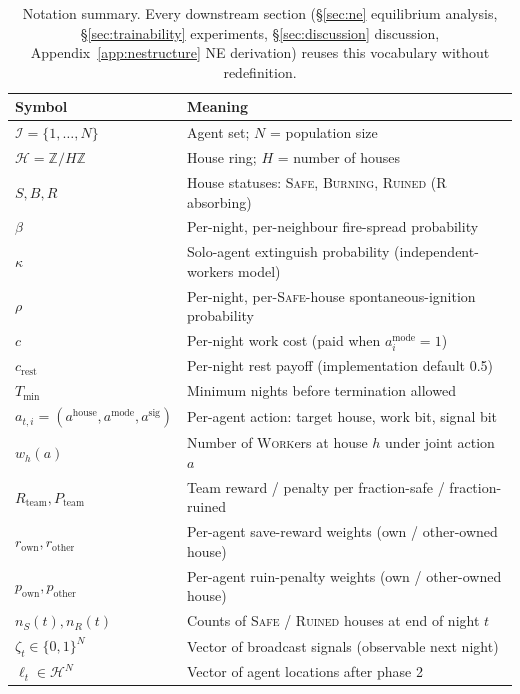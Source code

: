\documentclass{anvil-paper}
\begin{document}
\begin{table}[h]
  \centering
  \small
  \setlength{\tabcolsep}{4pt}
  \begin{tabular}{ll}
    \toprule
    Symbol & Meaning \\
    \midrule
    $\mathcal{I}=\{1,\ldots,N\}$ & Agent set; $N$ = population size \\
    $\mathcal{H}=\mathbb{Z}/H\mathbb{Z}$ & House ring; $H$ = number of houses \\
    $S,B,R$ & House statuses: \textsc{Safe}, \textsc{Burning}, \textsc{Ruined} (R absorbing) \\
    $\beta$ & Per-night, per-neighbour fire-spread probability \\
    $\kappa$ & Solo-agent extinguish probability (independent-workers model) \\
    $\rho$ & Per-night, per-\textsc{Safe}-house spontaneous-ignition probability \\
    $c$ & Per-night work cost (paid when $a_i^{\text{mode}}=1$) \\
    $c_{\text{rest}}$ & Per-night rest payoff (implementation default 0.5) \\
    $T_{\min}$ & Minimum nights before termination allowed \\
    $a_{t,i}=(a^{\text{house}},a^{\text{mode}},a^{\text{sig}})$
      & Per-agent action: target house, work bit, signal bit \\
    $w_h(a)$ & Number of \textsc{Work}ers at house $h$ under joint action $a$ \\
    $R_{\text{team}},P_{\text{team}}$
      & Team reward / penalty per fraction-safe / fraction-ruined \\
    $r_{\text{own}},r_{\text{other}}$
      & Per-agent save-reward weights (own / other-owned house) \\
    $p_{\text{own}},p_{\text{other}}$
      & Per-agent ruin-penalty weights (own / other-owned house) \\
    $n_S(t),n_R(t)$ & Counts of \textsc{Safe} / \textsc{Ruined} houses at end of night $t$ \\
    $\zeta_t\in\{0,1\}^N$ & Vector of broadcast signals (observable next night) \\
    $\ell_t\in\mathcal{H}^N$ & Vector of agent locations after phase 2 \\
    \bottomrule
  \end{tabular}
  \caption{Notation summary. Every downstream section (\S\ref{sec:ne}
  equilibrium analysis, \S\ref{sec:trainability} experiments,
  \S\ref{sec:discussion} discussion, Appendix~\ref{app:nestructure} NE
  derivation) reuses this vocabulary without redefinition.}
  \label{tab:notation}
\end{table}
\end{document}
